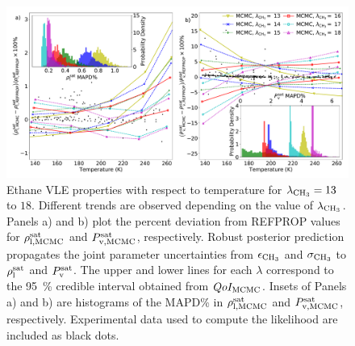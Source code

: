 \documentclass[preprint,letterpaper,floatfix,citeautoscript,aip,jcp]{revtex4-1}
\begin{document}
\begin{figure}[htb!]
	\centering
	\includegraphics[width=6.4in]{MCMC_ethane_VLE}
	\caption{Ethane VLE properties with respect to temperature for $\lambda_{\rm CH_3} = 13$ to $18$. Different trends are observed depending on the value of $\lambda_{\rm CH_3}$. Panels a) and b) plot the percent deviation from REFPROP values \cite{LEMMON-RP91,Ethane2006} for $\rho_{\rm l, MCMC}^{\rm sat}$ and $P_{\rm v, MCMC}^{\rm sat}$, respectively. Robust posterior prediction propagates the joint parameter uncertainties from $\epsilon_{\rm CH_3}$ and $\sigma_{\rm CH_3}$ to $\rho_{\rm l}^{\rm sat}$ and $P_{\rm v}^{\rm sat}$. The upper and lower lines for each $\lambda$ correspond to the 95~\% credible interval obtained from $QoI_{\rm MCMC}$.  Insets of Panels a) and b) are histograms of the MAPD\% in $\rho_{\rm l, MCMC}^{\rm sat}$ and $P_{\rm v, MCMC}^{\rm sat}$, respectively. Experimental data used to compute the likelihood are included as black dots. \cite{TDE} }
	\label{fig:MCMC_ethane_VLE}
\end{figure}
\end{document}

